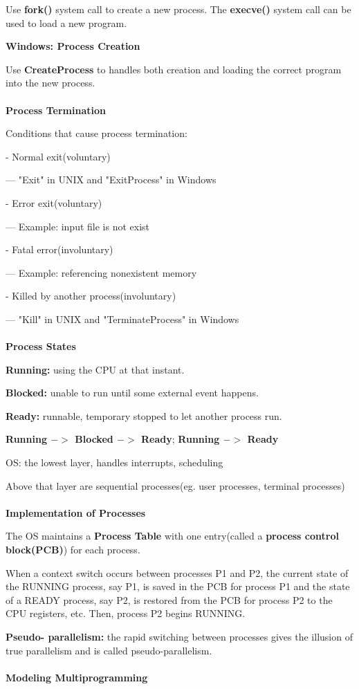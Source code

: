 \documentclass[]{report}
\begin{document}
Use \textbf{fork()} system call to create a new process. The
\textbf{execve()} system call can be used to load a new program.

\textbf{Windows: Process Creation}

Use \textbf{CreateProcess} to handles both creation and
loading the correct program into the new process.\\\\
\textbf{Process Termination}

Conditions that cause process termination:

- Normal exit(voluntary)

--- "Exit" in UNIX and "ExitProcess" in Windows

- Error exit(voluntary)

--- Example: input file is not exist

- Fatal error(involuntary)

--- Example: referencing nonexistent memory

- Killed by another process(involuntary)

--- "Kill" in UNIX and "TerminateProcess" in Windows\\\\
\textbf{Process States}

\textbf{Running: }using the CPU at that instant.

\textbf{Blocked: }unable to run until some external event happens.

\textbf{Ready: }runnable, temporary stopped to let another process run.

\textbf{Running $->$ Blocked $->$ Ready}; \textbf{Running $->$ Ready}

OS: the lowest layer, handles interrupts, scheduling

Above that layer are sequential processes(eg. user processes, terminal processes)\\\\
\textbf{Implementation of Processes}

The OS maintains a \textbf{Process Table} with one entry(called a \textbf{process control block(PCB)}) for each process.

When a context switch occurs between processes P1
and P2, the current state of the RUNNING process, say
P1, is saved in the PCB for process P1 and the state of a
READY process, say P2, is restored from the PCB for
process P2 to the CPU registers, etc. Then, process P2
begins RUNNING.

\textbf{Pseudo- parallelism:} the rapid switching between
processes gives the illusion of true parallelism and is
called pseudo-parallelism.\\\\
\textbf{Modeling Multiprogramming}
\end{document}
